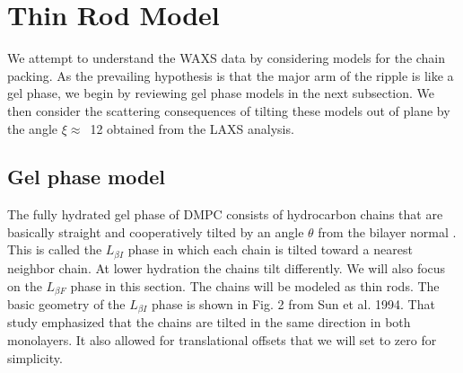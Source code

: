 \newpage
\section{Thin Rod Model}
We attempt to understand the WAXS data by considering models for the chain 
packing.  As the prevailing hypothesis is that the major arm of the ripple is 
like a gel phase, we begin by reviewing gel phase models in the next subsection.  
We then consider the scattering consequences of tilting these models out of 
plane by the angle $\xi\approx$~12{\textdegree} obtained from the LAXS analysis.

\subsection{Gel phase model}\label{sec:gel_model}
The fully hydrated gel phase of DMPC consists of hydrocarbon chains that are 
basically straight and cooperatively tilted by an angle $\theta$ from the 
bilayer normal \cite{ref:Smith88,ref:Tristram93,ref:Sun94,Tristram-Nagle02}. 
This is called the $L_{{\beta}I}$ phase in which each chain is tilted toward 
a nearest neighbor chain. At lower hydration the chains tilt differently. 
We will also focus on the $L_{{\beta}F}$ phase in this section.  The chains 
will be modeled as thin rods.  The basic geometry of the $L_{{\beta}I}$ phase 
is shown in Fig. 2 from Sun et al. 1994.  That study emphasized that the chains 
are tilted in the same direction in both monolayers. It also allowed for 
translational offsets that we will set to zero for simplicity.  

